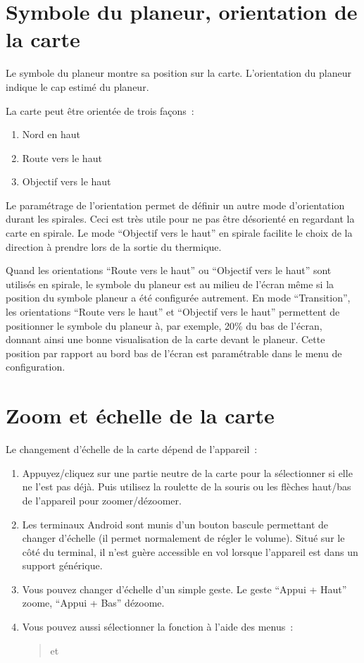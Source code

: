 \section{Symbole du planeur, orientation de la carte}
Le symbole du planeur montre sa position sur la carte. L'orientation du planeur indique le cap estimé du planeur.

La carte peut être orientée de trois façons~: 
\begin{enumerate}
\item Nord en haut
\item Route vers le haut
\item Objectif vers le haut
\end{enumerate}
Le paramétrage de l'orientation  permet de définir un autre mode d'orientation durant les spirales. Ceci est très utile pour ne pas être désorienté en regardant la carte en spirale. Le mode ``Objectif vers le haut'' en spirale facilite le choix de la direction à prendre lors de la sortie du thermique.

Quand les orientations ``Route vers le haut'' ou ``Objectif vers le haut'' sont utilisés en spirale, le symbole du planeur est au milieu de l'écran même si la position du symbole planeur a été configurée autrement.
En mode ``Transition'', les orientations ``Route vers le haut'' et ``Objectif vers le haut'' permettent de positionner le symbole du planeur à, par exemple, 20\% du bas de l'écran, donnant ainsi une bonne visualisation de la carte devant le planeur. Cette position par rapport au bord bas de l'écran est paramétrable dans le menu de
 configuration.

\section{Zoom et échelle de la carte}\label{sec:zooming}

Le changement d'échelle de la carte dépend de l'appareil~:
\begin{enumerate}
\item Appuyez/cliquez sur une partie neutre de la carte pour la sélectionner si elle ne l'est pas déjà.
Puis utilisez la roulette de la souris ou les flèches haut/bas de l'appareil pour zoomer/dézoomer.
\item Les terminaux Android sont munis d'un bouton bascule permettant de changer d'échelle (il permet normalement de régler le volume). Situé sur le côté du terminal, il n'est guère accessible en vol lorsque l'appareil est dans un support générique.
\item Vous pouvez changer d'échelle d'un simple geste. Le geste  
``Appui + Haut'' zoome, ``Appui + Bas'' dézoome.
\item Vous pouvez aussi sélectionner la fonction à l'aide des menus~:
\begin{quote}
\blink{} et \blink{}
\end{quote}
\end{enumerate}

